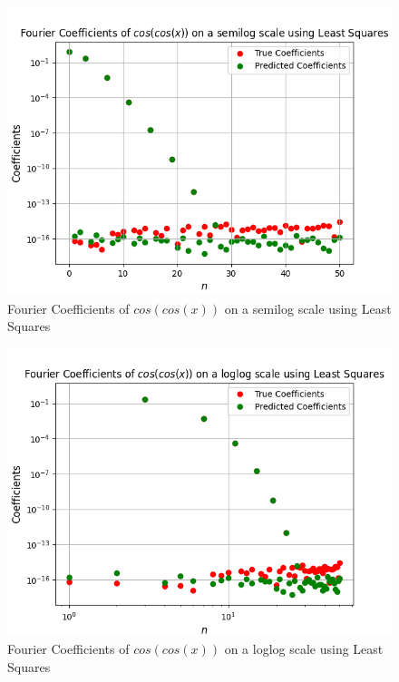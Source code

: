 \documentclass{article}
\begin{document}
\begin{figure}  
    \centering
    \includegraphics[scale = 0.4]{Figure_9.png}
    \caption{Fourier Coefficients of $cos(cos(x))$ on a semilog scale using Least Squares}
    \label{fig:my_label}
\end{figure}
\begin{figure}
    \centering
    \includegraphics[scale = 0.4]{Figure_10.png}
    \caption{Fourier Coefficients of $cos(cos(x))$ on a loglog scale using Least Squares}
    \label{fig:my_label}
\end{figure}
\end{document}
